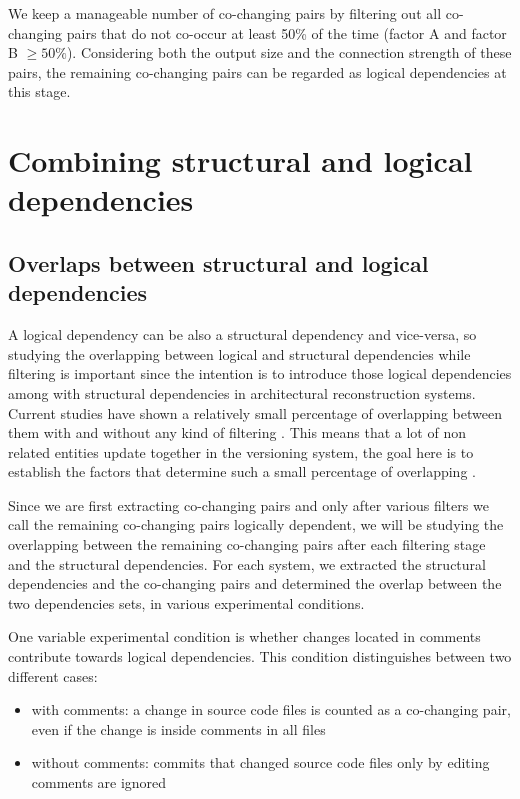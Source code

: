 We keep a manageable number of co-changing pairs by filtering out all co-changing pairs that do not co-occur at least 50\% of the time (factor A and factor B $\geq 50\%$). Considering both the output size and the connection strength of these pairs, the remaining co-changing pairs can be regarded as logical dependencies at this stage.


\chapter{Combining structural and logical dependencies}
\label{chap:combining_dependencies}


\section{Overlaps between structural and logical dependencies}
\label{sec:dependency_overlaps}

A logical dependency can be also a structural dependency and vice-versa, so studying the overlapping between logical and structural dependencies while filtering is important since the intention is to introduce those logical dependencies among with structural dependencies in architectural reconstruction systems. Current studies have shown a relatively small percentage of overlapping between them with and without any kind of filtering \cite{DBLP:journals/jss/AjienkaC17}. This means that a lot of non related entities update together in the versioning system, the goal here is to establish the factors that determine such a small percentage of overlapping \cite{enase19}.

Since we are first extracting co-changing pairs and only after various filters we call the remaining co-changing pairs logically dependent, we will be studying the overlapping between the remaining co-changing pairs after each filtering stage and the structural dependencies. 
For each system, we extracted the structural dependencies and the co-changing pairs and determined the overlap between the two dependencies sets, in various experimental conditions. 

One variable experimental condition is whether changes located in comments contribute towards logical dependencies. This condition distinguishes between two different cases: 
\begin{itemize}
	\item with comments: a change in source code files is counted as a co-changing pair, even if the change is inside comments in all files
	\item without comments: commits that changed source code files only by editing comments are ignored
\end{itemize}

